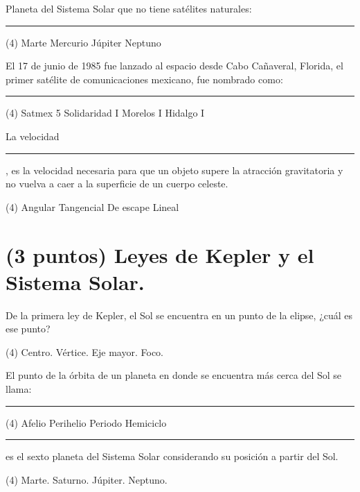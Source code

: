\documentclass[12pt, letter]{exam}
\begin{document}
\begin{questions}
    \question Planeta del Sistema Solar que no tiene satélites naturales: \rule{2cm}{0.1mm}
    \begin{tasks}(4)
        \task Marte
        \task Mercurio
        \task Júpiter
        \task Neptuno
    \end{tasks}
    \question El 17 de junio de 1985 fue lanzado al espacio desde Cabo Cañaveral, Florida, el primer satélite de comunicaciones mexicano, fue nombrado como: \rule{2cm}{0.1mm}
    \begin{tasks}(4)
        \task Satmex 5
        \task Solidaridad I
        \task Morelos I
        \task Hidalgo I
    \end{tasks}
    \question La velocidad \rule{2cm}{0.1mm}, es la velocidad necesaria para que un objeto supere la atracción gravitatoria y no vuelva a caer a la superficie de un cuerpo celeste.
    \begin{tasks}(4)
        \task Angular
        \task Tangencial
        \task De escape
        \task Lineal
    \end{tasks}


    \section{(3 puntos) Leyes de Kepler y el Sistema Solar.}

    \question De la primera ley de Kepler, el Sol se encuentra en un punto de la elipse, ¿cuál es ese punto?
    \begin{tasks}(4)
        \task Centro.
        \task Vértice.
        \task Eje mayor.
        \task Foco.
    \end{tasks}
    \question El punto de la órbita de un planeta en donde se encuentra más cerca del Sol se llama: \rule{2cm}{0.1mm}
    \begin{tasks}(4)
        \task Afelio
        \task Perihelio
        \task Periodo
        \task Hemiciclo
    \end{tasks}
    \question \rule{2cm}{0.1mm} es el sexto planeta del Sistema Solar considerando su posición a partir del Sol.
    \begin{tasks}(4)
        \task Marte.
        \task Saturno.
        \task Júpiter.
        \task Neptuno.
    \end{tasks}
   

\end{questions}
\end{document}

